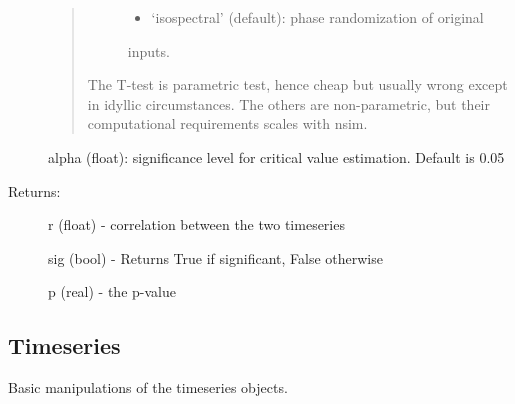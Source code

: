 \documentclass[letterpaper,10pt,english]{sphinxmanual}
\begin{document}
\begin{fulllineitems}
\begin{description}
\begin{quote}
\begin{description}
\begin{itemize}
\item {} 
‘isospectral’ (default): phase randomization of original

\end{itemize}

inputs.

\end{description}

The T-test is parametric test, hence cheap but usually wrong
except in idyllic circumstances.
The others are non-parametric, but their computational
requirements scales with nsim.
\end{quote}

alpha (float): significance level for critical value estimation. Default is 0.05

\item[{Returns:}] \leavevmode
r (float) - correlation between the two timeseries

sig (bool) -  Returns True if significant, False otherwise

p (real) - the p-value

\end{description}

\end{fulllineitems}



\subsection{Timeseries}
\label{\detokenize{Main:timeseries}}
Basic manipulations of the timeseries objects.
\end{document}
